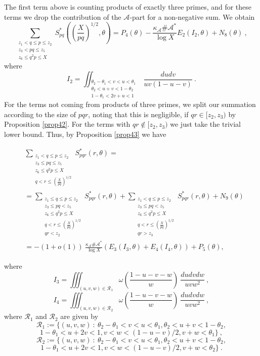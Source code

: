 \documentclass{amsart}
\numberwithin{equation}{subsection}
\begin{document}
The first term above is counting products of exactly three primes, and for these terms we drop the contribution of the $\mathcal{A}$-part for a non-negative sum. We obtain
\[
\sum_{\substack{z_1<q\leq p\leq z_2 \\ z_3< pq\leq z_5 \\ z_6\leq q^2p\leq  X}} S_{pq}^*\left(  \left(\frac{X}{pq}\right)^{1/2}, \theta\right)  = P_4(\theta)-\frac{\kappa_{\mathcal{A}}\#\mathcal{A}^*}{\log X} E_2(I_2, \theta)+N_8(\theta)\:,  \tag{4.7}
\]
where
$$I_2=\iint_{\substack{\theta_2-\theta_1<v<u<\theta_1 \\ \theta_2<u+v<1-\theta_2 \\ 1-\theta_1<2v+u<1  }} \frac{dudv}{uv(1-u-v)}\:.$$
For the terms not coming from products of three primes, we split our summation according to the size of $pqr$, noting that this is negligible, if 
$qr\in [z_2, z_3)$ by Proposition \ref{prop42}. For the terms with 
$qr\not\in [z_2, z_3)$ we just take the trivial lower bound. Thus, by Proposition \ref{prop43} we have

\begin{align*}
&\sum_{\substack{z_1<q\leq p\leq z_2 \\ z_3\leq  pq\leq z_5 \\ z_6\leq q^2p\leq  X \\ q<r\leq  \left(\frac{X}{pq}\right)^{1/2} }}  S_{pqr}^* (r,\theta)=\\
&=\sum_{\substack{z_1\leq q\leq p\leq z_2 \\ z_3\leq  pq< z_5 \\ z_6\leq q^2p\leq  X \\ q<r\leq  \left(\frac{X}{pq}\right)^{1/2} \\ qr<z_2 }}  S_{pqr}^* (r,\theta)
+
\sum_{\substack{z_1< q\leq p\leq z_2 \\ z_3\leq  pq< z_5 \\ z_6\leq q^2p\leq  X \\ q<r\leq  \left(\frac{X}{pq}\right)^{1/2} \\ qr>z_3 }}  S_{pqr}^* (r,\theta) + N_9(\theta)\\
&=-(1+o(1))\: \frac{\kappa_{\mathcal{A}}\#\mathcal{A}^*}{\log X} (E_3(I_3,\theta)+E_4(I_4,\theta))+P_5(\theta),
\end{align*}

where
\[
I_3=\iiint_{(u,v,w)\in\mathcal{R}_1} \omega\left( \frac{1-u-v-w}{w} \right)\:\frac{dudvdw}{uvw^2}\:,  \tag{4.8}
\]
\[
I_4=\iiint_{(u,v,w)\in\mathcal{R}_2} \omega\left( \frac{1-u-v-w}{w} \right)\:\frac{dudvdw}{uvw^2}\:,  \tag{4.9}
\]
where $\mathcal{R}_1$ and $\mathcal{R}_2$ are given by
$$\mathcal{R}_1:=\{(u,v,w)\::\: \theta_2-\theta_1<v<u<\theta_1, 
\theta_2<u+v<1-\theta_2,$$ 
$$1-\theta_1<u+2v<1, v<w<(1-u-v)/2, v+w<\theta_1\}\:,$$
$$\mathcal{R}_2:=\{(u,v,w)\::\: \theta_2-\theta_1<v<u<\theta_1, 
\theta_2<u+v<1-\theta_2,$$ 
$$1-\theta_1<u+2v<1, v<w<(1-u-v)/2, v+w<\theta_2\}\:.$$
\end{document}
